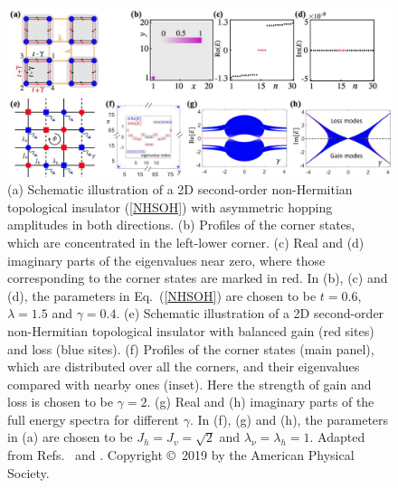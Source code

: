 \documentclass{tADP2e}
\theoremstyle{plain}
\theoremstyle{plain}
\theoremstyle{definition}
\begin{document}
\begin{figure}[!t]
\begin{center}
\includegraphics[width=14.5cm]{./Figures/fig_6_HOTI.pdf}
\end{center}
\caption{(a) Schematic illustration of a 2D second-order non-Hermitian topological insulator (\ref{NHSOH}) with asymmetric hopping amplitudes in both directions. (b) Profiles of the corner states, which are concentrated in the left-lower corner. (c) Real and (d) imaginary parts of the eigenvalues near zero, where those corresponding to the corner states are marked in red. In (b), (c) and (d), the parameters in Eq.~(\ref{NHSOH}) are chosen to be $t=0.6$, $\lambda=1.5$ and $\gamma=0.4$. (e) Schematic illustration of a 2D second-order non-Hermitian topological insulator with balanced gain (red sites) and loss (blue sites). (f) Profiles of the corner states (main panel), which are distributed over all the corners, and their eigenvalues compared with nearby ones (inset). Here the strength of gain and loss is chosen to be $\gamma=2$. (g) Real and (h) imaginary parts of the full energy spectra for different $\gamma$. In (f), (g) and (h), the parameters in (a) are chosen to be $J_h=J_v=\sqrt{2}$ and $\lambda_\nu=\lambda_h=1$. Adapted from Refs.~\cite{LT19} and \cite{LXW19}. Copyright \copyright\,  2019 by the American Physical Society.}
\label{fig:HOTI}
\end{figure}
\end{document}
